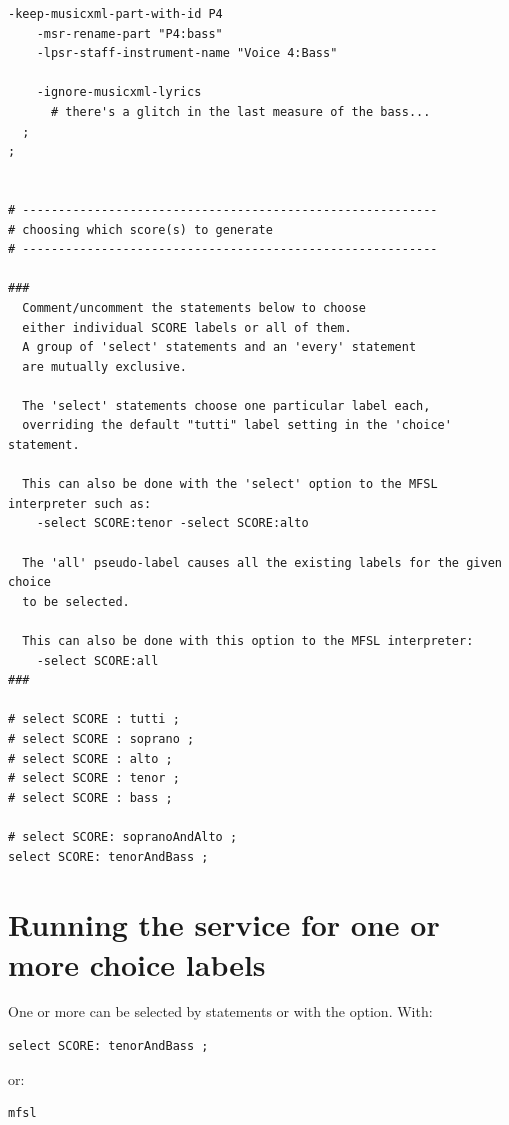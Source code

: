 \begin{lstlisting}[language=MFSL]
    -keep-musicxml-part-with-id P4
    -msr-rename-part "P4:bass"
    -lpsr-staff-instrument-name "Voice 4:Bass"

    -ignore-musicxml-lyrics
      # there's a glitch in the last measure of the bass...
  ;
;


# ----------------------------------------------------------
# choosing which score(s) to generate
# ----------------------------------------------------------

###
  Comment/uncomment the statements below to choose
  either individual SCORE labels or all of them.
  A group of 'select' statements and an 'every' statement
  are mutually exclusive.

  The 'select' statements choose one particular label each,
  overriding the default "tutti" label setting in the 'choice' statement.

  This can also be done with the 'select' option to the MFSL interpreter such as:
    -select SCORE:tenor -select SCORE:alto

  The 'all' pseudo-label causes all the existing labels for the given choice
  to be selected.

  This can also be done with this option to the MFSL interpreter:
    -select SCORE:all
###

# select SCORE : tutti ;
# select SCORE : soprano ;
# select SCORE : alto ;
# select SCORE : tenor ;
# select SCORE : bass ;

# select SCORE: sopranoAndAlto ;
select SCORE: tenorAndBass ;
\end{lstlisting}


\section{Running the service for one or more choice labels}

One or more can be selected by \code{select]} statements or with the  option.
With:
\begin{lstlisting}[language=MFSL]
select SCORE: tenorAndBass ;
\end{lstlisting}

 or:  %
\begin{lstlisting}[language=Terminal]
mfsl
\end{lstlisting}

